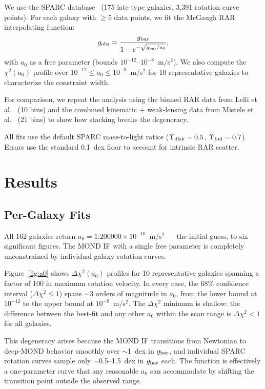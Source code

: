 \documentclass[twocolumn]{aastex631}
\begin{document}
We use the SPARC database~\cite{lelli2016} (175 late-type galaxies,
3,391 rotation curve points).  For each galaxy with $\ge 5$ data
points, we fit the McGaugh RAR interpolating function:
\begin{equation}
g_{\rm obs} = \frac{g_{\rm bar}}{1 - e^{-\sqrt{g_{\rm bar}/a_0}}},
\end{equation}
with $a_0$ as a free parameter (bounds $10^{-12}$--$10^{-8}$~m/s$^2$).
We also compute the $\chi^2(a_0)$ profile over $10^{-12} \le a_0 \le
10^{-9}$~m/s$^2$ for 10 representative galaxies to characterize the
constraint width.

For comparison, we repeat the analysis using the binned RAR data from
Lelli et al.~\cite{lelli2017} (10 bins) and the combined kinematic $+$
weak-lensing data from Mistele et al.~\cite{mistele2024} (21 bins) to
show how stacking breaks the degeneracy.

All fits use the default SPARC mass-to-light ratios ($\Upsilon_{\rm
disk}=0.5$, $\Upsilon_{\rm bul}=0.7$).  Errors use the standard 0.1~dex
floor to account for intrinsic RAR scatter.

\section{Results}

\subsection{Per-Galaxy Fits}

All 162 galaxies return $a_0 = 1.200000 \times 10^{-10}$~m/s$^2$ ---
the initial guess, to six significant figures.  The MOND IF with a single
free parameter is completely unconstrained by individual galaxy rotation
curves.

Figure~\ref{fig:a0} shows $\Delta\chi^2(a_0)$ profiles for 10
representative galaxies spanning a factor of 100 in maximum rotation
velocity.  In every case, the 68\% confidence interval ($\Delta\chi^2
\le 1$) spans $\sim$3 orders of magnitude in $a_0$, from the lower
bound at $10^{-12}$ to the upper bound at $10^{-9}$~m/s$^2$.  The
$\Delta\chi^2$ minimum is shallow: the difference between the best-fit
and any other $a_0$ within the scan range is $\Delta\chi^2 < 1$ for all
galaxies.

This degeneracy arises because the MOND IF transitions from Newtonian
to deep-MOND behavior smoothly over $\sim$1~dex in $g_{\rm bar}$, and
individual SPARC rotation curves sample only $\sim$0.5--1.5~dex in
$g_{\rm bar}$ each.  The function is effectively a one-parameter curve
that any reasonable $a_0$ can accommodate by shifting the transition
point outside the observed range.
\end{document}
